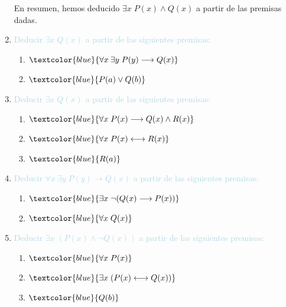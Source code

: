 \documentclass{article}
\newcommand{\lb}[1]{\textcolor{lightblue}{#1}}
\newcommand{\db}[1]{\textcolor{blue}{#1}}
\begin{document}
\begin{enumerate}[label=\color{red}\textbf{\arabic*)}, leftmargin=*]
      En resumen, hemos deducido $\exists x\;P(x) \wedge Q(x)$ a partir de las premisas dadas.
      \item \lb{Deducir $\exists x\;Q(x)$ a partir de las siguientes premisas:}
      \begin{enumerate}[label=\color{red}\alph*)]
            \item $\db{\forall x\:\exists y\;P(y)\longrightarrow Q(x)}$
            \item $\db{P(a)\vee Q(b)}$
      \end{enumerate}
      \item \lb{Deducir $\exists x\;Q(x)$ a partir de las siguientes premisas:}
      \begin{enumerate}[label=\color{red}\alph*)]
            \item $\db{\forall x\;P(x)\longrightarrow Q(x)\wedge R(x)}$
            \item $\db{\forall x\; P(x)\longleftrightarrow R(x)}$
            \item $\db{R(a)}$
      \end{enumerate}
      \item \lb{Deducir $\forall x\:\exists y\;P(y)\longrightarrow Q(x)$ a partir de las siguientes premisas:}
      \begin{enumerate}[label=\color{red}\alph*)]
            \item $\db{\exists x\;\neg(Q(x)\longrightarrow P(x))}$
            \item $\db{\forall x\;Q(x)}$
      \end{enumerate}
      \item \lb{Deducir $\exists x\;(P(x)\wedge\neg Q(x))$ a partir de las siguientes premisas:}
      \begin{enumerate}[label=\color{red}\alph*)]
            \item $\db{\forall x\;P(x)}$
            \item $\db{\exists x\;(P(x)\longleftrightarrow Q(x))}$
            \item $\db{Q(b)}$
      \end{enumerate}
\end{enumerate}
\newpage
\end{document}
